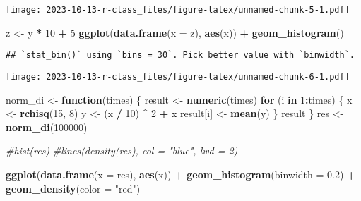 \documentclass[
]{article}
\newenvironment{Shaded}{\begin{snugshade}}{\end{snugshade}}
\newcommand{\AttributeTok}[1]{\textcolor[rgb]{0.13,0.29,0.53}{#1}}
\newcommand{\CommentTok}[1]{\textcolor[rgb]{0.56,0.35,0.01}{\textit{#1}}}
\newcommand{\ControlFlowTok}[1]{\textcolor[rgb]{0.13,0.29,0.53}{\textbf{#1}}}
\newcommand{\DecValTok}[1]{\textcolor[rgb]{0.00,0.00,0.81}{#1}}
\newcommand{\FloatTok}[1]{\textcolor[rgb]{0.00,0.00,0.81}{#1}}
\newcommand{\FunctionTok}[1]{\textcolor[rgb]{0.13,0.29,0.53}{\textbf{#1}}}
\newcommand{\NormalTok}[1]{#1}
\newcommand{\OtherTok}[1]{\textcolor[rgb]{0.56,0.35,0.01}{#1}}
\newcommand{\SpecialCharTok}[1]{\textcolor[rgb]{0.81,0.36,0.00}{\textbf{#1}}}
\newcommand{\StringTok}[1]{\textcolor[rgb]{0.31,0.60,0.02}{#1}}
\begin{document}
\texttt{[image: 2023-10-13-r-class\_files/figure-latex/unnamed-chunk-5-1.pdf]}

\begin{Shaded}
\begin{Highlighting}[]
\NormalTok{z }\OtherTok{\textless{}{-}}\NormalTok{ y }\SpecialCharTok{*} \DecValTok{10} \SpecialCharTok{+} \DecValTok{5}
\FunctionTok{ggplot}\NormalTok{(}\FunctionTok{data.frame}\NormalTok{(}\AttributeTok{x =}\NormalTok{ z), }\FunctionTok{aes}\NormalTok{(x)) }\SpecialCharTok{+}
  \FunctionTok{geom\_histogram}\NormalTok{() }
\end{Highlighting}
\end{Shaded}

\begin{verbatim}
## `stat_bin()` using `bins = 30`. Pick better value with `binwidth`.
\end{verbatim}

\texttt{[image: 2023-10-13-r-class\_files/figure-latex/unnamed-chunk-6-1.pdf]}

\begin{Shaded}
\begin{Highlighting}[]
\NormalTok{norm\_di }\OtherTok{\textless{}{-}} \ControlFlowTok{function}\NormalTok{(times) \{}
\NormalTok{  result }\OtherTok{\textless{}{-}} \FunctionTok{numeric}\NormalTok{(times)}
  \ControlFlowTok{for}\NormalTok{ (i }\ControlFlowTok{in} \DecValTok{1}\SpecialCharTok{:}\NormalTok{times) \{}
\NormalTok{    x }\OtherTok{\textless{}{-}} \FunctionTok{rchisq}\NormalTok{(}\DecValTok{15}\NormalTok{, }\DecValTok{8}\NormalTok{)}
\NormalTok{    y }\OtherTok{\textless{}{-}}\NormalTok{ (x }\SpecialCharTok{/} \DecValTok{10}\NormalTok{) }\SpecialCharTok{\^{}} \DecValTok{2} \SpecialCharTok{+}\NormalTok{ x}
\NormalTok{    result[i] }\OtherTok{\textless{}{-}} \FunctionTok{mean}\NormalTok{(y)}
\NormalTok{  \}}
\NormalTok{  result}
\NormalTok{\}}
\NormalTok{res }\OtherTok{\textless{}{-}} \FunctionTok{norm\_di}\NormalTok{(}\DecValTok{100000}\NormalTok{)}

\CommentTok{\#hist(res)}
\CommentTok{\#lines(density(res), col = "blue", lwd = 2)}

\FunctionTok{ggplot}\NormalTok{(}\FunctionTok{data.frame}\NormalTok{(}\AttributeTok{x =}\NormalTok{ res), }\FunctionTok{aes}\NormalTok{(x)) }\SpecialCharTok{+} 
  \FunctionTok{geom\_histogram}\NormalTok{(}\AttributeTok{binwidth =} \FloatTok{0.2}\NormalTok{) }\SpecialCharTok{+}
  \FunctionTok{geom\_density}\NormalTok{(}\AttributeTok{color =} \StringTok{"red"}\NormalTok{)}
\end{Highlighting}
\end{Shaded}
\end{document}
